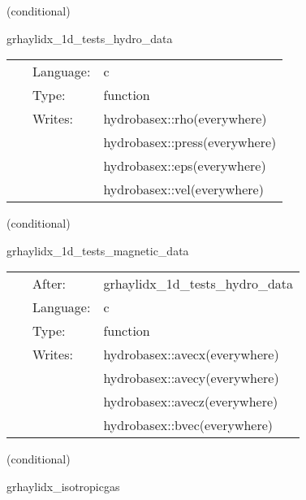 \documentclass{article}
\begin{document}
   (conditional) 

\hspace{5mm} grhaylidx\_1d\_tests\_hydro\_data 

\hspace{5mm}{\it set initial hydrodynamic data for 1d test } 


\hspace{5mm}

 \begin{tabular*}{160mm}{cll} 
~ & Language:  & c \\ 
~ & Type:  & function \\ 
~ & Writes:  & hydrobasex::rho(everywhere) \\ 
~& ~ &hydrobasex::press(everywhere)\\ 
~& ~ &hydrobasex::eps(everywhere)\\ 
~& ~ &hydrobasex::vel(everywhere)\\ 
\end{tabular*} 


\vspace{5mm}

   (conditional) 

\hspace{5mm} grhaylidx\_1d\_tests\_magnetic\_data 

\hspace{5mm}{\it set initial magnetic data for 1d test } 


\hspace{5mm}

 \begin{tabular*}{160mm}{cll} 
~ & After:  & grhaylidx\_1d\_tests\_hydro\_data \\ 
~ & Language:  & c \\ 
~ & Type:  & function \\ 
~ & Writes:  & hydrobasex::avecx(everywhere) \\ 
~& ~ &hydrobasex::avecy(everywhere)\\ 
~& ~ &hydrobasex::avecz(everywhere)\\ 
~& ~ &hydrobasex::bvec(everywhere)\\ 
\end{tabular*} 


\vspace{5mm}

   (conditional) 

\hspace{5mm} grhaylidx\_isotropicgas 
\end{document}
